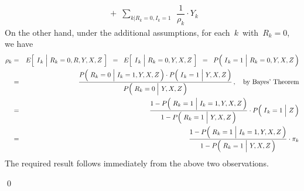 \begin{enumerate}
\begin{eqnarray*}
		\; + \;
		\underset{k\vert R_{k}=0,I_{k}=1}{\sum}\;\, \dfrac{1}{\rho_{k}} \cdot Y_{k}
	\end{eqnarray*}
	On the other hand, under the additional assumptions, for each \,$k$\, with \,$R_{k} = 0$,\, we have
	\begin{eqnarray*}
	\rho_{k}
	& = &
		E\!\left[\;\left.\overset{{\color{white}.}}{I}_{k}\;\right\vert\,R_{k}=0,R,Y,X,Z\;\right]
	\;\; = \;\;
		E\!\left[\;\left.\overset{{\color{white}.}}{I}_{k}\;\right\vert\,R_{k}=0,Y,X,Z\;\right]
	\;\; = \;\;
		P\!\left(\,\left.\overset{{\color{white}.}}{I}_{k}=1\;\right\vert\,R_{k}=0,Y,X,Z\,\right)
	\\
	& = &
		\dfrac{
			P\!\left(\,\left.\overset{{\color{white}.}}{R}_{k}=0\;\right\vert\,I_{k}=1,Y,X,Z\,\right)
			\cdot
			P\!\left(\,\left.\overset{{\color{white}.}}{I}_{k}=1\;\right\vert\,Y,X,Z\,\right)
			}{
			P\!\left(\,\left.\overset{{\color{white}.}}{R}_{k}=0\;\right\vert\,Y,X,Z\,\right)
			}\,,
		\quad
		\textnormal{by Bayes' Theorem}
	\\
	& = &
		\dfrac{
			1 - P\!\left(\,\left.\overset{{\color{white}.}}{R}_{k}=1\;\right\vert\,I_{k}=1,Y,X,Z\,\right)
			}{
			1 - P\!\left(\,\left.\overset{{\color{white}.}}{R}_{k}=1\;\right\vert\,Y,X,Z\,\right)
			}
		\cdot
		P\!\left(\,\left.\overset{{\color{white}.}}{I}_{k}=1\;\right\vert\,Z\,\right)
	\\
	& = &
		\dfrac{
			1 - P\!\left(\,\left.\overset{{\color{white}.}}{R}_{k}=1\;\right\vert\,I_{k}=1,Y,X,Z\,\right)
			}{
			1 - P\!\left(\,\left.\overset{{\color{white}.}}{R}_{k}=1\;\right\vert\,Y,X,Z\,\right)
			}
		\cdot
		\pi_{k}
	\end{eqnarray*}
	The required result follows immediately from the above two observations.
\end{enumerate}
\qed



\renewcommand{\theenumi}{\roman{enumi}}
\renewcommand{\labelenumi}{\textnormal{(\theenumi)}$\;\;$}

